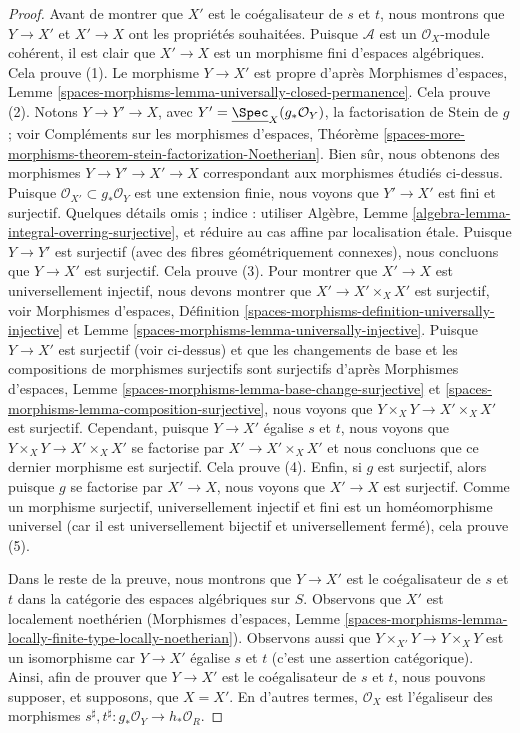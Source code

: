 \begin{proof}
\medskip\noindent
Avant de montrer que $X'$ est le coégalisateur de $s$ et $t$, nous montrons que $Y \to X'$ et $X' \to X$ ont les propriétés souhaitées. Puisque $\mathcal{A}$ est un $\mathcal{O}_X$-module cohérent, il est clair que $X' \to X$ est un morphisme fini d'espaces algébriques. Cela prouve (1).
Le morphisme $Y \to X'$ est propre d'après Morphismes d'espaces, Lemme \ref{spaces-morphisms-lemma-universally-closed-permanence}. Cela prouve (2).
Notons $Y \to Y' \to X$, avec $Y' = \underline{\Spec}_X(g_*\mathcal{O}_Y)$, la factorisation de Stein de $g$ ; voir Compléments sur les morphismes d'espaces, Théorème \ref{spaces-more-morphisms-theorem-stein-factorization-Noetherian}.
Bien sûr, nous obtenons des morphismes $Y \to Y' \to X' \to X$ correspondant aux morphismes étudiés ci-dessus.
Puisque $\mathcal{O}_{X'} \subset g_*\mathcal{O}_Y$ est une extension finie, nous voyons que $Y' \to X'$ est fini et surjectif.
Quelques détails omis ; indice : utiliser Algèbre, Lemme \ref{algebra-lemma-integral-overring-surjective}, et réduire au cas affine par localisation \'etale. Puisque $Y \to Y'$ est surjectif (avec des fibres géométriquement connexes), nous concluons que $Y \to X'$ est surjectif. Cela prouve (3). Pour montrer que $X' \to X$ est universellement injectif, nous devons montrer que $X' \to X' \times_X X'$ est surjectif, voir Morphismes d'espaces, Définition \ref{spaces-morphisms-definition-universally-injective} et Lemme \ref{spaces-morphisms-lemma-universally-injective}. Puisque $Y \to X'$ est surjectif (voir ci-dessus) et que les changements de base et les compositions de morphismes surjectifs sont surjectifs d'après Morphismes d'espaces, Lemme \ref{spaces-morphisms-lemma-base-change-surjective} et \ref{spaces-morphisms-lemma-composition-surjective}, nous voyons que $Y \times_X Y \to X' \times_X X'$ est surjectif. Cependant, puisque $Y \to X'$ égalise $s$ et $t$, nous voyons que $Y \times_X Y \to X' \times_X X'$ se factorise par $X' \to X' \times_X X'$ et nous concluons que ce dernier morphisme est surjectif. Cela prouve (4). Enfin, si $g$ est surjectif, alors puisque $g$ se factorise par $X' \to X$, nous voyons que $X' \to X$ est surjectif. Comme un morphisme surjectif, universellement injectif et fini est un homéomorphisme universel (car il est universellement bijectif et universellement fermé), cela prouve (5).

\medskip\noindent
Dans le reste de la preuve, nous montrons que $Y \to X'$ est le coégalisateur de $s$ et $t$ dans la catégorie des espaces algébriques sur $S$. Observons que $X'$ est localement noethérien (Morphismes d'espaces, Lemme \ref{spaces-morphisms-lemma-locally-finite-type-locally-noetherian}). Observons aussi que $Y \times_{X'} Y \to Y \times_X Y$ est un isomorphisme car $Y \to X'$ égalise $s$ et $t$ (c'est une assertion catégorique). Ainsi, afin de prouver que $Y \to X'$ est le coégalisateur de $s$ et $t$, nous pouvons supposer, et supposons, que $X = X'$. En d'autres termes, $\mathcal{O}_X$ est l'égaliseur des morphismes $s^\sharp, t^\sharp : g_*\mathcal{O}_Y \to h_*\mathcal{O}_R$.


\end{proof}
